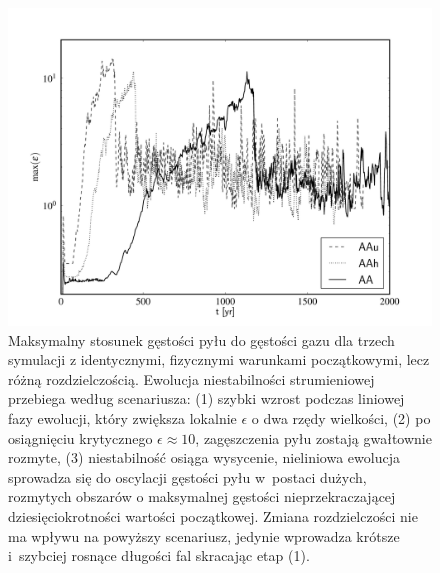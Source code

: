\begin{figure}
   \includegraphics[width=0.98\linewidth]{figures/fig4}
   \caption{
      Maksymalny stosunek gęstości pyłu do gęstości gazu dla trzech symulacji z
      identycznymi, fizycznymi warunkami początkowymi, lecz różną
      rozdzielczością. Ewolucja niestabilności strumieniowej przebiega według
      scenariusza: (1) szybki wzrost podczas liniowej fazy ewolucji, który
      zwiększa lokalnie $\epsilon$ o dwa rzędy wielkości, (2) po
      osiągnięciu krytycznego $\epsilon\approx 10$, zagęszczenia pyłu zostają
      gwałtownie rozmyte, (3) niestabilność osiąga wysycenie, nieliniowa
      ewolucja sprowadza się do oscylacji gęstości pyłu w~postaci dużych,
      rozmytych obszarów o maksymalnej gęstości nieprzekraczającej
      dziesięciokrotności wartości początkowej. Zmiana rozdzielczości nie ma
      wpływu na powyższy scenariusz, jedynie wprowadza krótsze i~szybciej
   rosnące długości fal skracając etap (1).}

   \label{fig4}
\end{figure}
%

